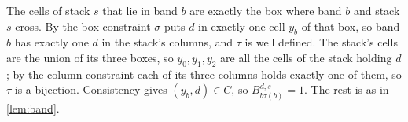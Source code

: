 The cells of stack $s$ that lie in band $b$ are exactly the box where band $b$ and stack $s$ cross. By the box
constraint $\sigma$ puts $d$ in exactly one cell $y_b$ of that box, so band $b$ has exactly one $d$ in the stack's
columns, and $\tau$ is well defined. The stack's cells are the union of its three boxes, so $y_0,y_1,y_2$ are all the
cells of the stack holding $d$; by the column constraint each of its three columns holds exactly one of them, so $\tau$
is a bijection. Consistency gives $(y_b,d)\in C$, so $B^{d,s}_{b\tau(b)}=1$. The rest is as in \cref{lem:band}.

